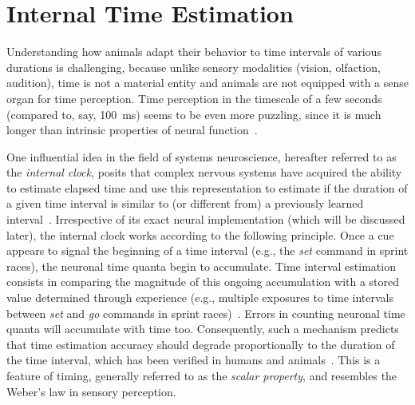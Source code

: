 \section{Internal Time Estimation}
\label{ch:intro:InternalTimeEstimation}

Understanding how animals adapt their behavior to time intervals of various durations is challenging, because unlike sensory modalities (vision, olfaction, audition), time is not a material entity and animals are not equipped with a sense organ for time perception.
Time perception in the timescale of a few seconds (compared to, say, 100~ms) seems to be even more puzzling, since it is much longer than intrinsic properties of neural function~\cite{Buhusi2005NatRevNeuro}. 
\par
One influential idea in the field of systems neuroscience, hereafter referred to as the \textit{internal clock}, posits that complex nervous systems have acquired the ability to estimate elapsed time and use this representation to estimate if the duration of a given time interval is similar to (or different from) a previously learned interval~\cite{Gibbon1977, Miali1989NeuComp, Gouvea2015Elife,Wittmann2013NatRevNeurosci}.
Irrespective of its exact neural implementation (which will be discussed later), the internal clock works according to the following principle.
Once a cue appears to signal the beginning of a time interval (e.g., the \textit{set} command in sprint races), the neuronal time quanta begin to accumulate.
Time interval estimation consists in comparing the magnitude of this ongoing accumulation with a stored value determined through experience (e.g., multiple exposures to time intervals between \textit{set} and \textit{go} commands in sprint races)~\cite{Simen2011JNeuro}.
Errors in counting neuronal time quanta will accumulate with time too.
Consequently, such a mechanism predicts that time estimation accuracy should degrade proportionally to the duration of the time interval, which has been verified in humans and animals~\cite{Gibbon1977, Lejeune1991LearnMotiv, Rakitin1998, Whitaker2003JExpPsy, Zarco2009JNeurophys, Hinton2004, JazayeriNN2018, Gallistel2004}.
This is a feature of timing, generally referred to as the \emph{scalar property}, and resembles the Weber's law in sensory perception.\footnotemark
{}
